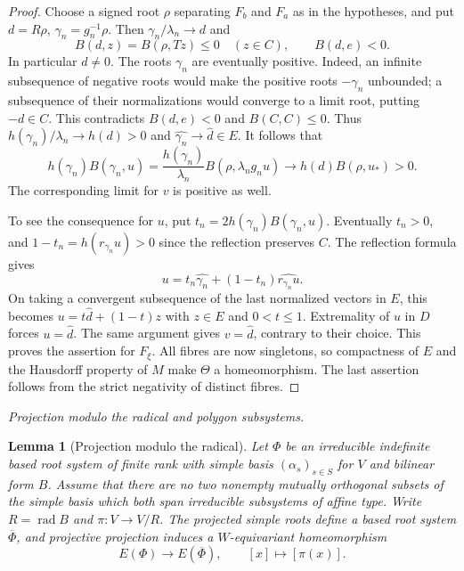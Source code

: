 \documentclass[11pt,reqno]{amsart}
\theoremstyle{plain}
\newtheorem{lemma}[theorem]{Lemma}
\theoremstyle{definition}
\theoremstyle{remark}
\numberwithin{equation}{section}
\begin{document}
\begin{proof}
Choose a signed root $\rho$ separating $F_b$ and $F_a$ as in the
hypotheses, and put $d=R\rho$, $\gamma_n=g_n^{-1}\rho$.
Then $\gamma_n/\lambda_n\to d$ and
\[
 B(d,z)=B(\rho,Tz)\leq0\quad(z\in C),\qquad B(d,e)<0.
\]
In particular $d\ne0$. The roots $\gamma_n$ are eventually positive.
Indeed, an infinite subsequence of negative roots would make the
positive roots $-\gamma_n$ unbounded; a subsequence of their
normalizations would converge to a limit root, putting $-d\in C$.
This contradicts $B(d,e)<0$ and $B(C,C)\leq0$.
Thus $h(\gamma_n)/\lambda_n\to h(d)>0$ and
$\widehat{\gamma_n}\to\widehat d\in E$. It follows that
\[
 h(\gamma_n)B(\gamma_n,u)
  =\frac{h(\gamma_n)}{\lambda_n}B(\rho,\lambda_n g_nu)
  \longrightarrow h(d)B(\rho,u_*)>0 .
\]
The corresponding limit for $v$ is positive as well.

To see the consequence for $u$, put
$t_n=2h(\gamma_n)B(\gamma_n,u)$. Eventually $t_n>0$, and
$1-t_n=h(r_{\gamma_n}u)>0$ since the reflection preserves $C$.
The reflection formula gives
\[
 u=t_n\widehat{\gamma_n}+(1-t_n)\widehat{r_{\gamma_n}u}.
\]
On taking a convergent subsequence of the last normalized vectors in
$E$, this becomes $u=t\widehat d+(1-t)z$ with $z\in E$ and
$0<t\leq1$. Extremality of $u$ in $D$ forces $u=\widehat d$.
The same argument gives $v=\widehat d$, contrary to their choice.
This proves the assertion for $F_\xi$. All fibres are now singletons,
so compactness of $E$ and the Hausdorff property of $M$ make
$\Theta$ a homeomorphism. The last assertion follows from the
strict negativity of distinct fibres.
\end{proof}

\par\medskip
\noindent\emph{Projection modulo the radical and polygon subsystems.}

\begin{lemma}[Projection modulo the radical]\label{p14:lem:radical}
Let $\Phi$ be an irreducible indefinite based root system of finite rank
with simple basis $(\alpha_s)_{s\in S}$ for $V$ and bilinear form $B$.
Assume that there are no two nonempty mutually orthogonal subsets of the
simple basis which both span irreducible subsystems of affine type.
Write $R=\operatorname{rad}B$ and $\pi\colon V\to V/R$.
The projected simple roots define a based root system $\overline\Phi$,
and projective projection induces a $W$-equivariant homeomorphism
\[
   E(\Phi)\longrightarrow E(\overline\Phi),
   \qquad [x]\longmapsto[\pi(x)].
\]
\end{lemma}
\end{document}
